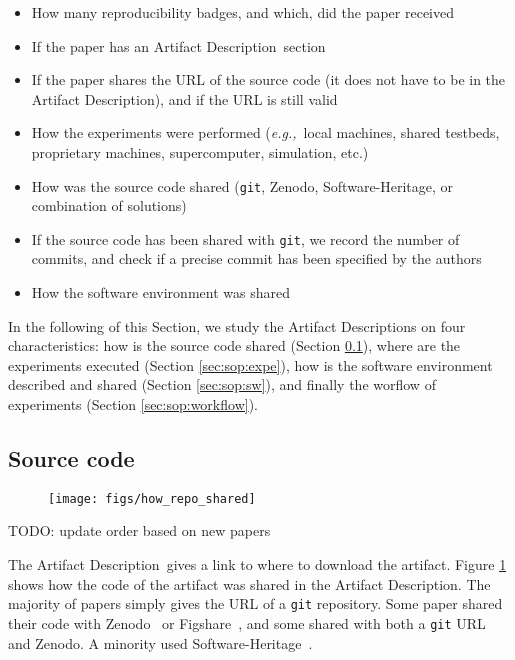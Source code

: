 \documentclass[sigconf,natbib=false]{acmart}
\newcommand{\eg}{\emph{e.g.,}}
\newcommand{\ad}{Artifact Description}
\newcommand{\todo}[1]{{\color{red}TODO: #1}}
\begin{document}
\begin{itemize}
  \item How many reproducibility badges, and which, did the paper received
  \item If the paper has an \ad\ section
  \item If the paper shares the URL of the source code (it does not have to be in the \ad), and if the URL is still valid
  \item How the experiments were performed (\eg\ local machines, shared testbeds, proprietary machines, supercomputer, simulation, etc.)
  \item How was the source code shared (\texttt{git}, Zenodo, Software-Heritage, or combination of solutions)
  \item If the source code has been shared with \texttt{git}, we record the number of commits, and check if a precise commit has been specified by the authors
  \item How the software environment was shared
\end{itemize}


In the following of this Section, we study the \ad s on four characteristics: how is the source code shared (Section \ref{sec:sop:src}), where are the experiments executed (Section \ref{sec:sop:expe}), how is the software environment described and shared (Section \ref{sec:sop:sw}), and finally the worflow of experiments (Section \ref{sec:sop:workflow}).

\subsection{Source code}\label{sec:sop:src}

\begin{figure}
  \centering
  \texttt{[image: figs/how\_repo\_shared]}
  \caption{}\label{fig:how_repo_shared}
\end{figure}

\todo{update order based on new papers}

The \ad\ gives a link to where to download the artifact.
Figure \ref{fig:how_repo_shared} shows how the code of the artifact was shared in the \ad.
The majority of papers simply gives the URL of a \texttt{git} repository.
Some paper shared their code with Zenodo\ \cite{zenodo} or Figshare\ \cite{figshare}, and some shared with both a \texttt{git} URL and Zenodo.
A minority used Software-Heritage\ \cite{swheritage}.
\end{document}
